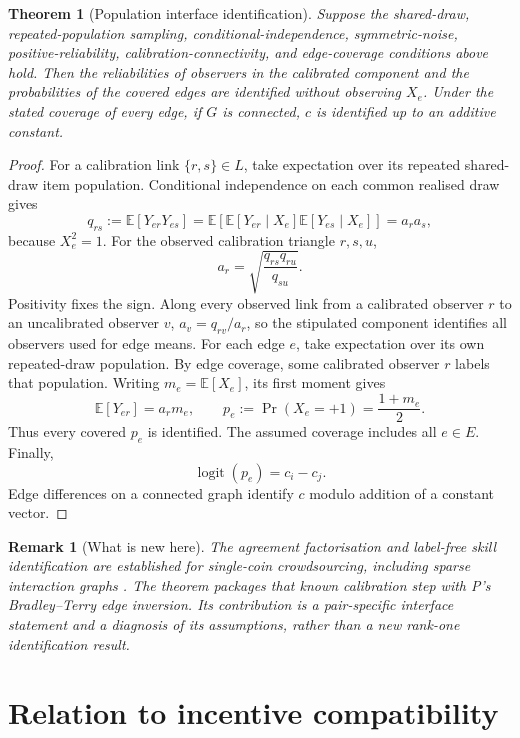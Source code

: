 \documentclass{article}
\newtheorem{theorem}{Theorem}
\newtheorem{remark}{Remark}
\DeclareMathOperator{\logit}{logit}
\begin{document}
\begin{theorem}[Population interface identification]
Suppose the shared-draw, repeated-population sampling, conditional-independence, symmetric-noise, positive-reliability, calibration-connectivity, and edge-coverage conditions above hold.  Then the reliabilities of observers in the calibrated component and the probabilities of the covered edges are identified without observing $X_e$.  Under the stated coverage of every edge, if $G$ is connected, $c$ is identified up to an additive constant. %
\end{theorem}

\begin{proof}
For a calibration link $\{r,s\}\in L$, take expectation over its repeated shared-draw item population.  Conditional independence on each common realised draw gives
\[
q_{rs}:=\mathbb{E}[Y_{er}Y_{es}]
=\mathbb{E}\!\left[
  \mathbb{E}[Y_{er}\mid X_e]
  \mathbb{E}[Y_{es}\mid X_e]
\right]
=a_ra_s,
\]
because $X_e^2=1$. %
For the observed calibration triangle $r,s,u$,
\[
a_r=\sqrt{\frac{q_{rs}q_{ru}}{q_{su}}}.
\]
Positivity fixes the sign.  Along every observed link from a calibrated observer $r$ to an uncalibrated observer $v$, $a_v=q_{rv}/a_r$, so the stipulated component identifies all observers used for edge means. %
For each edge $e$, take expectation over its own repeated-draw population.  By edge coverage, some calibrated observer $r$ labels that population.  Writing $m_e=\mathbb{E}[X_e]$, its first moment gives
\[
\mathbb{E}[Y_{er}]=a_rm_e,
\qquad p_e:=\Pr(X_e=+1)=\frac{1+m_e}{2}.
\]
Thus every covered $p_e$ is identified.  The assumed coverage includes all $e\in E$.  Finally,
\[
\logit(p_e)=c_i-c_j.
\]
Edge differences on a connected graph identify $c$ modulo addition of a constant vector. %
\end{proof}

\begin{remark}[What is new here]
The agreement factorisation and label-free skill identification are established for single-coin crowdsourcing, including sparse interaction graphs \cite{ma2017crowdsourcing,ma2019gradient}.  The theorem packages that known calibration step with P's Bradley--Terry edge inversion.  Its contribution is a pair-specific interface statement and a diagnosis of its assumptions, rather than a new rank-one identification result. %
\end{remark}

\section{Relation to incentive compatibility}
\end{document}
